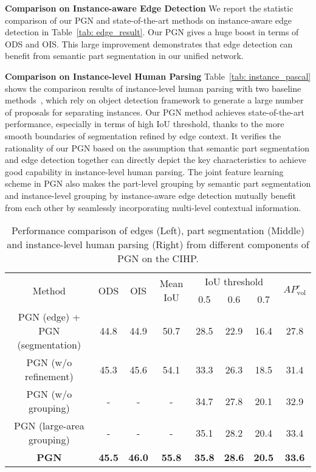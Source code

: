 \documentclass[runningheads]{llncs}
\begin{document}
\textbf{Comparison on Instance-aware Edge Detection} 
We report the statistic comparison of our PGN and state-of-the-art methods on instance-aware edge detection in Table~\ref{tab: edge_result}. Our PGN gives a huge boost in terms of ODS and OIS. This large improvement demonstrates that edge detection can benefit from semantic part segmentation in our unified network.

\textbf{Comparison on Instance-level Human Parsing} 
Table~\ref{tab: instance_pascal} shows the comparison results of instance-level human parsing with two baseline methods~\cite{Dai_2016_CVPR,li2017holistic}, which rely on object detection framework to generate a large number of proposals for separating instances. Our PGN method achieves state-of-the-art performance, especially in terms of high IoU threshold, thanks to the more smooth boundaries of segmentation refined by edge context. It verifies the rationality of our PGN based on the assumption that semantic part segmentation and edge detection together can directly depict the key characteristics to achieve good capability in instance-level human parsing. The joint feature learning scheme in PGN also makes the part-level grouping by semantic part segmentation and instance-level grouping by instance-aware edge detection mutually benefit from each other by seamlessly incorporating multi-level contextual information.

\begin{table}[t]
\centering
\small
\caption{Performance comparison of edges (Left), part segmentation (Middle) and instance-level human parsing (Right) from different components of PGN on the CIHP.}
\tabcolsep 0.03in 
\begin{tabular}{c|cc|c|cccc}
\toprule[0.7pt]
\multirow{2}{*}{Method}        &  \multirow{2}{*}{ODS} & \multirow{2}{*}{OIS} & \multirow{2}{*}{Mean IoU} 
                               & \multicolumn{3}{c}{IoU threshold} &  \multirow{2}{*}{$AP^r_\text{vol}$}   \\ 
                                &   &  &  & 0.5 & 0.6 & 0.7 &   \\ \hline                     
PGN (edge) + PGN (segmentation) & 44.8       & 44.9      & 50.7   & 28.5  & 22.9  & 16.4  & 27.8  \\
PGN (w/o refinement)            & 45.3       & 45.6      & 54.1   & 33.3  & 26.3  & 18.5  & 31.4  \\   
PGN (w/o grouping)              & -          & -         & -      & 34.7  & 27.8  & 20.1  & 32.9  \\
PGN (large-area grouping)       & -          & -         & -      & 35.1  & 28.2  & 20.4  & 33.4  \\     \hline
\textbf{PGN}   & \textbf{45.5} & \textbf{46.0} & \textbf{55.8} & \textbf{35.8} & \textbf{28.6} & \textbf{20.5} & \textbf{33.6} \\   
\toprule[0.7pt]
\end{tabular}
\vspace{-8mm}
\label{tab: results_cihp}
\end{table}
\end{document}
